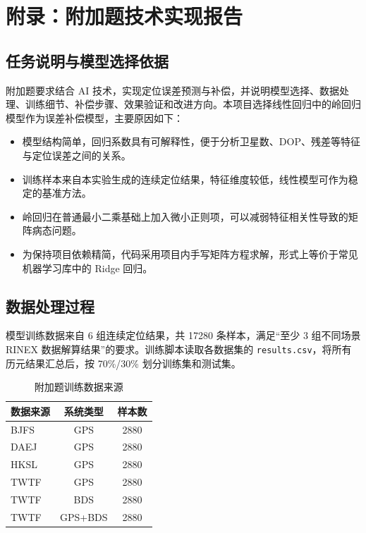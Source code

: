 \appendix
\section{附录：附加题技术实现报告}

\subsection{任务说明与模型选择依据}

附加题要求结合 AI 技术，实现定位误差预测与补偿，并说明模型选择、数据处理、训练细节、补偿步骤、效果验证和改进方向。本项目选择线性回归中的岭回归模型作为误差补偿模型，主要原因如下：

\begin{itemize}
\item 模型结构简单，回归系数具有可解释性，便于分析卫星数、DOP、残差等特征与定位误差之间的关系。
\item 训练样本来自本实验生成的连续定位结果，特征维度较低，线性模型可作为稳定的基准方法。
\item 岭回归在普通最小二乘基础上加入微小正则项，可以减弱特征相关性导致的矩阵病态问题。
\item 为保持项目依赖精简，代码采用项目内手写矩阵方程求解，形式上等价于常见机器学习库中的 Ridge 回归。
\end{itemize}

\subsection{数据处理过程}

模型训练数据来自 6 组连续定位结果，共 17280 条样本，满足“至少 3 组不同场景 RINEX 数据解算结果”的要求。训练脚本读取各数据集的 \texttt{results.csv}，将所有历元结果汇总后，按 70\%/30\% 划分训练集和测试集。

\begin{table}[H]
\centering
\small
\begin{tabular}{lcc}
\toprule
数据来源 & 系统类型 & 样本数 \\
\midrule
BJFS & GPS & 2880 \\
DAEJ & GPS & 2880 \\
HKSL & GPS & 2880 \\
TWTF & GPS & 2880 \\
TWTF & BDS & 2880 \\
TWTF & GPS+BDS & 2880 \\
\bottomrule
\end{tabular}
\caption{附加题训练数据来源}
\end{table}

